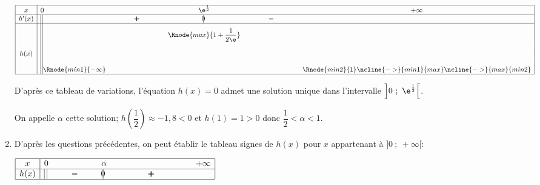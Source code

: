 \begin{enumerate}
\begin{center}
{\renewcommand{\arraystretch}{1.5}
\def\esp{\hspace*{2.5cm}}%
\def\hauteur{20pt}%
$\begin{array}{|c|l*4{c}|}
\hline
x & 0  & \esp & \e^{\frac{1}{2}} & \esp & +\infty \\ 
\hline
h'(x) &  \vline\;\vline  &   \pmb{+} & \vline\hspace{-2.7pt}0 & \pmb{-} & \\ 
\hline
 & \vline\;\vline &  &   \Rnode{max}{1+\dfrac{1}{2\e}}  &  &  \rule{0pt}{\hauteur} \\  
h(x) &  \vline\;\vline &     &  &  &  \rule{0pt}{\hauteur} \\ 
 & \vline\;\vline \Rnode{min1}{-\infty} &   &  &  &   \Rnode{min2}{1} \rule{0pt}{\hauteur}    
 \ncline{->}{min1}{max} 
 \ncline{->}{max}{min2} 
 \\ 
\hline
\end{array} $
}
\end{center}	

D'après ce tableau de variations, l'équation $h(x)=0$ admet une solution unique  dans l'intervalle $\left  ] 0~;~\e^{\frac{1}{2}}\right [$.

On appelle $\alpha$ cette solution; $h\left (\dfrac{1}{2}\right ) \approx -1,8<0$ et $h(1)=1>0$ donc $\dfrac{1}{2} < \alpha < 1$.

\item D'après les questions précédentes, on peut établir le tableau  signes de $h(x)$ pour $x$ appartenant à $]0~;~ +\infty[$:

\begin{center}
{\renewcommand{\arraystretch}{1.5}
\def\esp{\hspace*{1.5cm}}%
\def\hauteur{20pt}%
$\begin{array}{|c|l*4{c}|}
\hline
x & 0  & \esp & \alpha & \esp \esp & +\infty \\ 
\hline
h(x) &  \vline\;\vline  &   \pmb{-} & \vline\hspace{-2.7pt}0 & \pmb{+} & \\ 
\hline
\end{array} $
}
\end{center}	

\end{enumerate}

